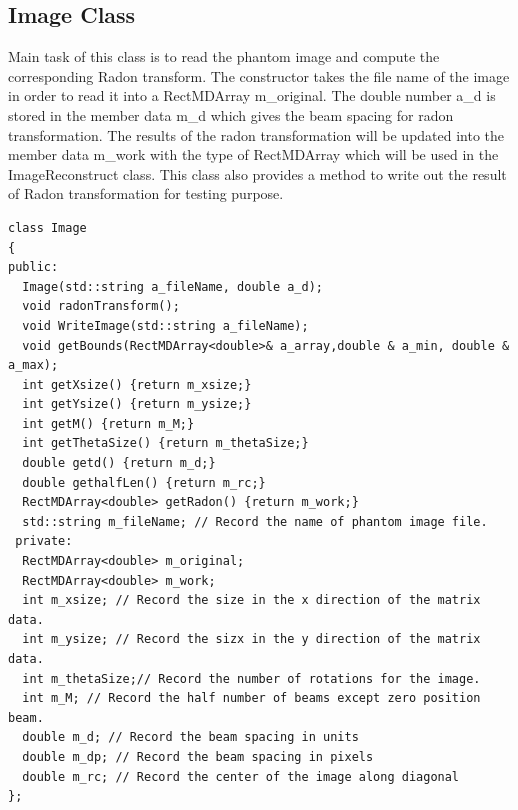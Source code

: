 \subsection{Image Class}
Main task of this class is to read the phantom image and compute the corresponding Radon transform. The constructor takes the file name of the image in order to read it into a RectMDArray m\_original. The double number a\_d is stored in the member data m\_d which gives the beam spacing for radon transformation. The results of the radon transformation will be updated into the member data m\_work with the type of RectMDArray which will be used in the ImageReconstruct class. This class also provides a method to write out the result of Radon transformation for testing purpose.  

\begin{verbatim}
class Image
{
public:
  Image(std::string a_fileName, double a_d);
  void radonTransform();
  void WriteImage(std::string a_fileName);
  void getBounds(RectMDArray<double>& a_array,double & a_min, double & a_max);
  int getXsize() {return m_xsize;}
  int getYsize() {return m_ysize;}
  int getM() {return m_M;}
  int getThetaSize() {return m_thetaSize;}
  double getd() {return m_d;}
  double gethalfLen() {return m_rc;}
  RectMDArray<double> getRadon() {return m_work;}
  std::string m_fileName; // Record the name of phantom image file.
 private:
  RectMDArray<double> m_original;
  RectMDArray<double> m_work;
  int m_xsize; // Record the size in the x direction of the matrix data.
  int m_ysize; // Record the sizx in the y direction of the matrix data.
  int m_thetaSize;// Record the number of rotations for the image.
  int m_M; // Record the half number of beams except zero position beam.
  double m_d; // Record the beam spacing in units
  double m_dp; // Record the beam spacing in pixels
  double m_rc; // Record the center of the image along diagonal
};
\end{verbatim}

